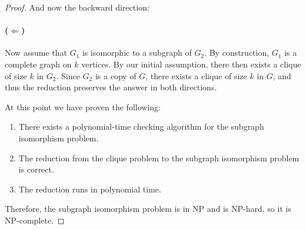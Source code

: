 \documentclass{article}
\begin{document}
\begin{proof}
    \vspace{1em}
    \noindent
    And now the backward direction:
    \paragraph{($\Leftarrow$)}
    Now assume that $G_1$ is isomorphic to a subgraph of $G_2$.
    By construction, $G_1$ is a complete graph on $k$ vertices.
    By our initial assumption, there then exists a clique of size $k$ in $G_2$.
    Since $G_2$ is a copy of $G$, there exists a clique of size $k$ in $G$,
    and thus the reduction preserves the answer in both directions.

    \vspace{1em}
    \noindent
    At this point we have proven the following:
    \begin{enumerate}
        \item There exists a polynomial-time checking algorithm for the subgraph isomorphism problem.
        \item The reduction from the clique problem to the subgraph isomorphism problem is correct.
        \item The reduction runs in polynomial time.
    \end{enumerate}
    Therefore, the subgraph isomorphism problem is in NP and is NP-hard, so it is NP-complete.
\end{proof}
\end{document}
